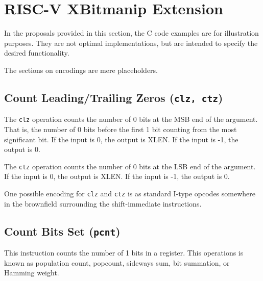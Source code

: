 \chapter{RISC-V XBitmanip Extension}

In the proposals provided in this section, the C code examples are for
illustration purposes. They are not optimal implementations, but are
intended to specify the desired functionality.

The sections on encodings are mere placeholders.


\section{Count Leading/Trailing Zeros (\texttt{clz, ctz})}

The {\tt clz} operation counts the number of 0 bits at the MSB end of the
argument.  That is, the number of 0 bits before the first 1 bit counting from
the most significant bit. If the input is 0, the output is XLEN. If the input
is -1, the output is 0.

The {\tt ctz} operation counts the number of 0 bits at the LSB end of the
argument. If the input is 0, the output is XLEN. If the input is -1, the
output is 0.





One possible encoding for \texttt{clz} and \texttt{ctz} is as standard I-type opcodes
somewhere in the brownfield surrounding the shift-immediate instructions.

%
%


\section{Count Bits Set (\texttt{pcnt})}

This instruction counts the number of 1 bits in a register. This operations is known as
population count, popcount, sideways sum, bit summation, or Hamming weight.~\cite{HammingWeight,Warren12}

